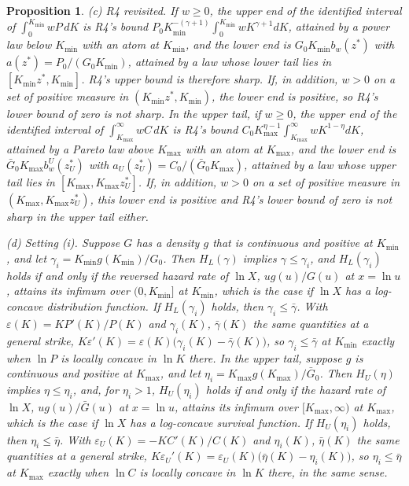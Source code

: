 \documentclass[11pt]{article}
\newtheorem{proposition}{Proposition}
\theoremstyle{remark}
\begin{document}
\begin{proposition}
(c) \emph{R4 revisited.} If $w\ge0$, the upper end of the identified interval of $\int_0^{K_{\min}}wP\,dK$ is R4's bound $P_0K_{\min}^{-(\gamma+1)}\int_0^{K_{\min}}wK^{\gamma+1}dK$, attained by a power law below $K_{\min}$ with an atom at $K_{\min}$, and the lower end is $G_0K_{\min}b_w(z^*)$ with $a(z^*)=P_0/(G_0K_{\min})$, attained by a law whose lower tail lies in $[K_{\min}z^*,K_{\min}]$. R4's upper bound is therefore sharp. If, in addition, $w>0$ on a set of positive measure in $(K_{\min}z^*,K_{\min})$, the lower end is positive, so R4's lower bound of zero is not sharp. In the upper tail, if $w\ge0$, the upper end of the identified interval of $\int_{K_{\max}}^\infty wC\,dK$ is R4's bound $C_0K_{\max}^{\eta-1}\int_{K_{\max}}^\infty wK^{1-\eta}dK$, attained by a Pareto law above $K_{\max}$ with an atom at $K_{\max}$, and the lower end is $\bar G_0K_{\max}b^U_w(z^*_U)$ with $a_U(z^*_U)=C_0/(\bar G_0K_{\max})$, attained by a law whose upper tail lies in $[K_{\max},K_{\max}z^*_U]$. If, in addition, $w>0$ on a set of positive measure in $(K_{\max},K_{\max}z^*_U)$, this lower end is positive and R4's lower bound of zero is not sharp in the upper tail either.

(d) \emph{Setting (i).} Suppose $G$ has a density $g$ that is continuous and positive at $K_{\min}$, and let $\gamma_i=K_{\min}g(K_{\min})/G_0$. Then $H_L(\gamma)$ implies $\gamma\le\gamma_i$, and $H_L(\gamma_i)$ holds if and only if the reversed hazard rate of $\ln X$, $ug(u)/G(u)$ at $x=\ln u$, attains its infimum over $(0,K_{\min}]$ at $K_{\min}$, which is the case if $\ln X$ has a log-concave distribution function. If $H_L(\gamma_i)$ holds, then $\gamma_i\le\bar\gamma$. With $\varepsilon(K)=KP'(K)/P(K)$ and $\gamma_i(K)$, $\bar\gamma(K)$ the same quantities at a general strike, $K\varepsilon'(K)=\varepsilon(K)\bigl(\gamma_i(K)-\bar\gamma(K)\bigr)$, so $\gamma_i\le\bar\gamma$ at $K_{\min}$ exactly when $\ln P$ is locally concave in $\ln K$ there. In the upper tail, suppose $g$ is continuous and positive at $K_{\max}$, and let $\eta_i=K_{\max}g(K_{\max})/\bar G_0$. Then $H_U(\eta)$ implies $\eta\le\eta_i$, and, for $\eta_i>1$, $H_U(\eta_i)$ holds if and only if the hazard rate of $\ln X$, $ug(u)/\bar G(u)$ at $x=\ln u$, attains its infimum over $[K_{\max},\infty)$ at $K_{\max}$, which is the case if $\ln X$ has a log-concave survival function. If $H_U(\eta_i)$ holds, then $\eta_i\le\bar\eta$. With $\varepsilon_U(K)=-KC'(K)/C(K)$ and $\eta_i(K)$, $\bar\eta(K)$ the same quantities at a general strike, $K\varepsilon_U'(K)=\varepsilon_U(K)\bigl(\bar\eta(K)-\eta_i(K)\bigr)$, so $\eta_i\le\bar\eta$ at $K_{\max}$ exactly when $\ln C$ is locally concave in $\ln K$ there, in the same sense.


\end{proposition}
\end{document}

